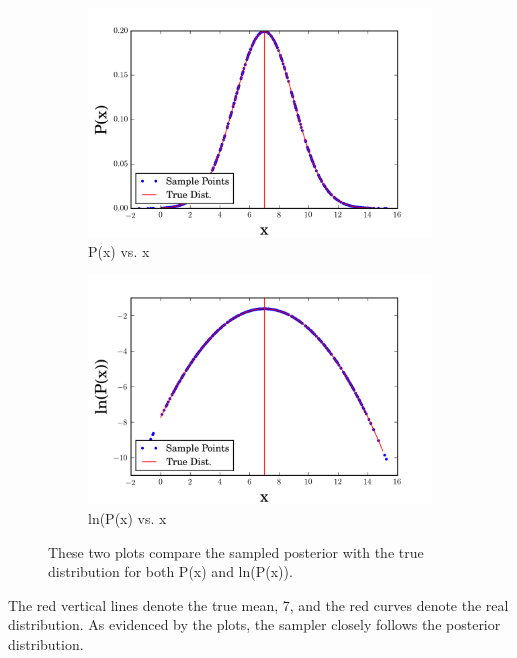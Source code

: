 \documentclass[english,12pt]{article}
\begin{document}
\begin{figure}[H]
\centering
\begin{subfigure}{.5\textwidth}
  \centering
  \includegraphics[width=\linewidth]{p_x_mcmc_true.png}
  \caption{P(x) vs. x}
  \label{fig:sub1}
\end{subfigure}%
\begin{subfigure}{0.5\textwidth}
  \centering
  \includegraphics[width=\linewidth]{lnp_x_true_mcmc.png}
  \caption{ln(P(x) vs. x}
  \label{fig:sub2}
\end{subfigure}
\caption{These two plots compare the sampled posterior with the true distribution for both P(x) and ln(P(x)).}
\label{fig:test}
\end{figure}
 The red vertical lines denote the true mean, 7, and the red curves denote the real distribution. As evidenced by the plots, the sampler closely follows the posterior distribution.
\end{document}
